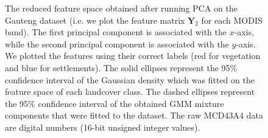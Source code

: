 \documentclass{article}
\begin{document}
\begin{figure}[h!]
%
\caption{The reduced feature space obtained after running PCA on the Gauteng dataset (i.e. we plot the feature matrix $\mathbf{Y}_2$ for each MODIS band). The first
principal component is associated with the $x$-axis, while the second principal component is associated with the $y$-axis. We plotted the features using their correct labels (red for vegetation 
and blue for settlements). The solid ellipses represent the 95\% confidence interval of the Gaussian density which was fitted on the feature space of each landcover class.
The dashed ellipses represent the 95\% confidence interval of the obtained GMM mixture components that were fitted to the dataset. 
The raw MCD43A4 data are digital numbers (16-bit unsigned integer values).}
\label{fig:density_PCA}
%
\end{figure}


\vfill
\pagebreak
\end{document}
